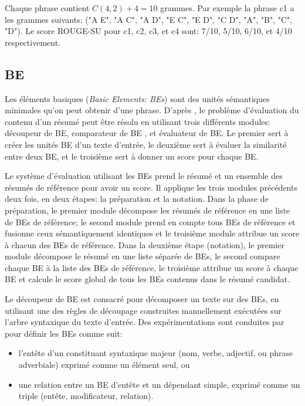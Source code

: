 \documentclass[a4paper,12pt,oneside]{../use/ESIthesis}
\begin{document}
Chaque phrase contient $C(4,2) + 4 = 10$ grammes. 
Par exemple la phrase c1 a les grammes suivants: ("A E", "A C", "A D", "E C", "E D", "C D", "A", "B", "C", "D"). 
Le score ROUGE-SU pour c1, c2, c3, et c4 sont: 7/10, 5/10, 6/10, et 4/10 respectivement.

\subsection{BE}

Les éléments basiques (\textit{Basic Elements: BEs}) sont des unités sémantiques minimales qu'on peut obtenir d'une phrase. 
D'après \cite{06-hovy-al}, le problème d'évaluation du contenu d'un résumé peut être résolu en utilisant trois différents modules: découpeur de BE, comparateur de BE , et évaluateur de BE. 
Le premier sert à créer les unités BE d'un texte d'entrée, le deuxième sert à évaluer la similarité entre deux BE, et le troisième sert à donner un score pour chaque BE.

Le système d'évaluation utilisant les BEs prend le résumé et un ensemble des résumés de référence pour avoir un score. 
Il applique les trois modules précédents deux fois, en deux étapes: la préparation et la notation. 
Dans la phase de préparation, le premier module décompose les résumés de référence en une liste de BEs de référence; le second module prend en compte tous BEs de référence et fusionne ceux sémantiquement identiques et le troisième module attribue un score à chacun des BEs de référence.
Dans la deuxième étape (notation), le premier module décompose le résumé en une liste séparée de BEs, le second compare chaque BE à la liste des BEs de référence, le troisième attribue un score à chaque BE et calcule le score global de tous les BEs contenus dans le résumé candidat.

Le découpeur de BE est consacré pour décomposer un texte sur des BEs, en utilisant une des règles de découpage construites manuellement exécutées sur l'arbre syntaxique du texte d'entrée. 
Des expérimentations sont conduites par \cite{06-hovy-al} pour définir les BEs comme suit:
\begin{itemize}
\item l'entête d'un constituant syntaxique majeur (nom, verbe, adjectif, ou phrase adverbiale) exprimé comme un élément seul, ou
\item une relation entre un BE d'entête et un dépendant simple, exprimé comme un triple (entête, modificateur, relation).
\end{itemize}
\end{document}
